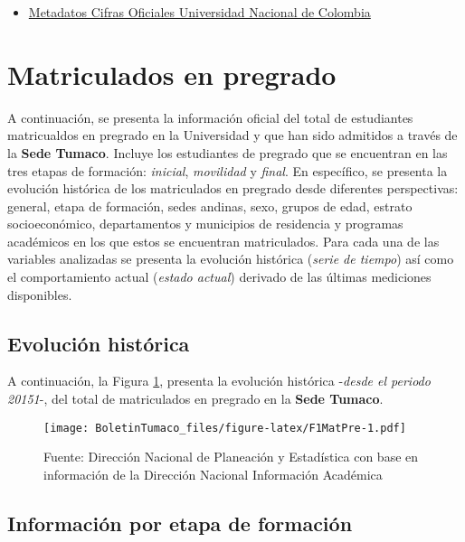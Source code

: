 \documentclass[
]{book}
\providecommand{\tightlist}{%
  \setlength{\itemsep}{0pt}\setlength{\parskip}{0pt}}
\begin{document}
\begin{itemize}
\tightlist
\item
  \href{http://estadisticas.unal.edu.co/menu-principal/cifras-generales/metadatos/cifras-generales/}{Metadatos Cifras Oficiales Universidad Nacional de Colombia}
\end{itemize}

\hypertarget{MatPre}{%
\section{Matriculados en pregrado}\label{MatPre}}

A continuación, se presenta la información oficial del total de estudiantes matricualdos en pregrado en la Universidad y que han sido admitidos a través de la \textbf{Sede Tumaco}. Incluye los estudiantes de pregrado que se encuentran en las tres etapas de formación: \emph{inicial}, \emph{movilidad} y \emph{final}. En específico, se presenta la evolución histórica de los matriculados en pregrado desde diferentes perspectivas: general, etapa de formación, sedes andinas, sexo, grupos de edad, estrato socioeconómico, departamentos y municipios de residencia y programas académicos en los que estos se encuentran matriculados. Para cada una de las variables analizadas se presenta la evolución histórica (\emph{serie de tiempo}) así como el comportamiento actual (\emph{estado actual}) derivado de las últimas mediciones disponibles.

\hypertarget{evoluciuxf3n-histuxf3rica-2}{%
\subsection{Evolución histórica}\label{evoluciuxf3n-histuxf3rica-2}}

A continuación, la Figura \ref{fig:F1MatPre}, presenta la evolución histórica -\emph{desde el periodo 20151}-, del total de matriculados en pregrado en la \textbf{Sede Tumaco}.

\begin{figure}
\centering
\texttt{[image: BoletinTumaco\_files/figure-latex/F1MatPre-1.pdf]}
\caption{\label{fig:F1MatPre}Fuente: Dirección Nacional de Planeación y Estadística con base en información de la Dirección Nacional Información Académica}
\end{figure}

\hypertarget{informaciuxf3n-por-etapa-de-formaciuxf3n}{%
\subsection{Información por etapa de formación}\label{informaciuxf3n-por-etapa-de-formaciuxf3n}}
\end{document}
